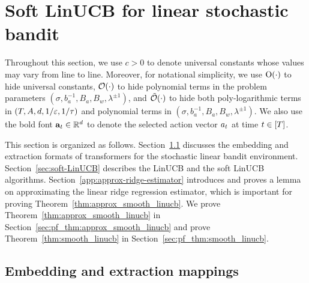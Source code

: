 \section{Soft LinUCB for linear stochastic bandit}\label{app:linUCB}
Throughout this section, we use $c>0$ to denote universal constants whose values may vary from line to line.
Moreover, for notational simplicity, we use ${\mathrm{O}}(\cdot)$ to hide universal constants, $\mathcal{O}(\cdot)$ to hide polynomial terms in the problem parameters $(\sigma,b_a^{-1},B_a,B_w,\lambda^{\pm1})$, and ${\tilde{\mathcal O}}(\cdot)$ to hide both poly-logarithmic terms in $(T,A,d,1/\varepsilon,1/{\tau})$ and  polynomial terms in  $(\sigma,b_a^{-1},B_a,B_w,\lambda^{\pm1})$. We also use the bold font ${\mathbf a}_t\in\mathbb{R}^d$ to denote the selected action vector ${a}_t$ at time $t\in[{T}]$.


This section is organized as follows. Section~\ref{sec:tf_embed_bandit} discusses the embedding and extraction formats of transformers for the stochastic linear bandit environment. Section~\ref{sec:soft-LinUCB} describes the LinUCB and the soft LinUCB algorithms. Section~\ref{app:approx-ridge-estimator} introduces and proves a lemma on approximating the linear ridge regression estimator, which is important for proving Theorem~\ref{thm:approx_smooth_linucb}. We prove Theorem~\ref{thm:approx_smooth_linucb} in Section~\ref{sec:pf_thm:approx_smooth_linucb} and prove Theorem~\ref{thm:smooth_linucb} in Section~\ref{sec:pf_thm:smooth_linucb}.


\subsection{Embedding and extraction mappings}\label{sec:tf_embed_bandit}

